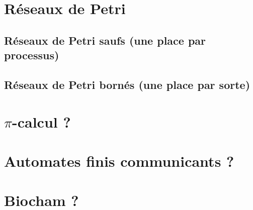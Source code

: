 

\section{Réseaux de Petri}
  \subsection{Réseaux de Petri saufs (une place par processus)}
  \subsection{Réseaux de Petri bornés (une place par sorte)}

\section{$\pi$-calcul ?}

\section{Automates finis communicants ?}

\section{Biocham ?}
